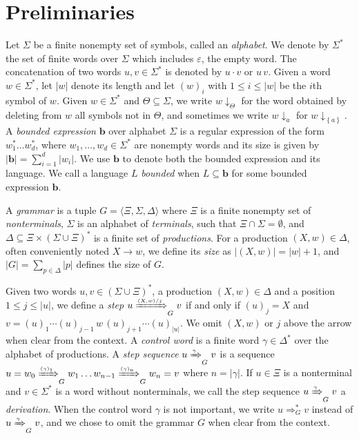 \documentclass[final]{llncs}
\newcommand{\Arrow}[1]{\xRightarrow{{\scriptscriptstyle #1}}}
\def\set#1{{\left\{ #1 \right\}}}
\def\tuple#1{{\langle #1 \rangle}}
\def\len#1{{\vert{#1}\vert}}
\def\prod{\Delta}
\def\pat{{\mathbf{b}}}
\def\Vars{\ensuremath{\Xi}}
\def\proj{\mathbin{\downarrow}}
\renewcommand{\proj}[2]{{#1}\mathclose{\downarrow}_{{#2}}}
\begin{document}
\section{Preliminaries}\label{sec:prelim}

Let $\Sigma$ be a finite nonempty set of symbols, called
an \emph{alphabet}. We denote by $\Sigma^*$ the set of finite words
over $\Sigma$ which includes $\varepsilon$, the empty word. The concatenation
of two words $u,v\in\Sigma^*$ is denoted by $u\cdot v$ or $u\, v$.
Given a word \(w\in\Sigma^*\), let \(\len{w}\) denote its length and
let \((w)_i\) with \(1\leq i\leq \len{w}\) be the \(i\)th symbol
of \(w\). Given \(w\in\Sigma^*\) and \(\Theta\subseteq\Sigma\), we
write \(\proj{w}{\Theta}\) for the word obtained by deleting
from \(w\) all symbols not in \(\Theta\), and sometimes we
write \(\proj{w}{a}\) for \(\proj{w}{\set{a}}\).
A {\em bounded expression} \(\pat\) over alphabet \(\Sigma\) is a regular
expression of the form $w_1^* \ldots w_d^*$, where $w_1,\ldots,w_d \in
\Sigma^*$ are nonempty words and its size is given by \(\len{\pat}=\sum_{i=1}^d
\len{w_i}\).  We use $\pat$ to denote both the bounded expression and its
language. We call a language \(L\) \emph{bounded} when \(L\subseteq\pat\) for some bounded expression \(\pat\).

A \emph{grammar} is a tuple \(G=\tuple{\Vars,\Sigma,\prod}\)
where \(\Vars\) is a finite nonempty set
of \emph{nonterminals}, \(\Sigma\) is an alphabet of \emph{terminals},
such that \(\Vars \cap \Sigma = \emptyset\), and
\(\prod \subseteq \Vars\times (\Sigma\cup \Vars)^*\) is a finite set
of \emph{productions}. For a production $(X,w)
\in \prod$, often conveniently noted \(X \rightarrow w\), we define its {\em
size} as $\len{(X,w)} = \len{w}+1$, and $\len{G}
= \sum_{p\in\prod} \len{p}$ defines the size of $G$.

Given two words $u,v \in (\Sigma \cup \Vars)^*$, a production \(
(X,w)\in\prod\) and a position \(1\leq j\leq \len{u}\), we define
a \emph{step} $u \Arrow{(X,w)/j}_G v$ if and only if \( (u)_j = X\)
and \( v = (u)_1 \cdots (u)_{j-1} \, w\, (u)_{j+1}\cdots
(u)_{\len{u}}\). We omit \( (X,w)\) or \(j\) above the arrow when
clear from the context.
A \emph{control word} is a finite word \(\gamma\in\prod^*\) over the
alphabet of productions. A \emph{step sequence} \( u \Arrow{\gamma}_G
v\) is a sequence \(u = w_{0} \Arrow{(\gamma)_1}_G
w_1 \ldots w_{n-1}\Arrow{(\gamma)_n}_G w_n = v\) where \(n = \len{\gamma}\).
If \(u\in\Vars\) is a nonterminal and \(v\in\Sigma^*\) is a word
without nonterminals, we call the step sequence \(u \Arrow{\gamma}_G
v\) a \emph{derivation}. When the control word \(\gamma\) is not
important, we write \(u \Rightarrow^*_G v\) instead
of \(u \Arrow{\gamma}_G v\), and we chose to omit the grammar \(G\)
when clear from the context.
\end{document}
